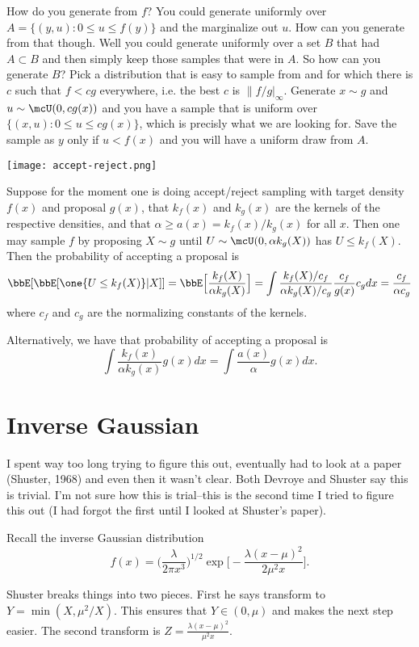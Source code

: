 \documentclass{article}
\begin{document}
How do you generate from $f$?  You could generate uniformly over $A = \{ (y,u) :
0 \leq u \leq f(y) \}$ and the marginalize out $u$.  How can you generate from
that though.  Well you could generate uniformly over a set $B$ that had $A
\subset B$ and then simply keep those samples that were in $A$.  So how can you
generate $B$?  Pick a distribution that is easy to sample from and for which
there is $c$ such that $f < cg$ everywhere, i.e. the best $c$ is
$\|f/g|_\infty$.  Generate $x \sim g$ and $u \sim \mcU(0, cg(x))$ and you have a
sample that is uniform over $\{(x,u) : 0 \leq u \leq cg(x) \}$, which is
precisly what we are looking for.  Save the sample as $y$ only if $u < f(x)$ and
you will have a uniform draw from $A$.

\texttt{[image: accept-reject.png]}

Suppose for the moment one is doing accept/reject sampling with target density
$f(x)$ and proposal $g(x)$, that $k_f(x)$ and $k_g(x)$ are the kernels of the
respective densities, and that $\alpha \geq a(x) = k_f(x) / k_g(x)$ for all $x$.
Then one may sample $f$ by proposing $X \sim g$ until $U \sim \mcU(0, \alpha
k_g(X))$ has $U \leq k_f(X)$.  Then the probability of accepting a proposal is
\[
\bbE[ \bbE[\one \{U \leq k_f(X)\} | X] ] = \bbE \Big[ \frac{k_f(X)}{\alpha
  k_g(X)} \Big] = \int \frac{k_f(X) / c_f}{\alpha k_g(X)/c_g}
\frac{c_f}{g(x)}{c_g} dx = \frac{c_f}{\alpha c_g}
\]
where $c_f$ and $c_g$ are the normalizing constants of the kernels.

Alternatively, we have that probability of accepting a proposal is
\[
\int \frac{k_f(x)}{\alpha k_g(x)} g(x) dx = \int \frac{a(x)}{\alpha} g(x) dx.
\]

\section{Inverse Gaussian}

I spent way too long trying to figure this out, eventually had to look at a
paper (Shuster, 1968) and even then it wasn't clear.  Both Devroye and Shuster
say this is trivial.  I'm not sure how this is trial--this is the second time I
tried to figure this out (I had forgot the first until I looked at Shuster's
paper).

Recall the inverse Gaussian distribution
\[
f(x) = \Big( \frac{\lambda}{2 \pi x^3} \Big)^{1/2} 
\exp \Big[ - \frac{\lambda(x-\mu)^2}{2 \mu^2 x} \Big].
\]

Shuster breaks things into two pieces. First he says transform to $Y = \min(X,
\mu^2 / X)$.  This ensures that $Y \in (0, \mu)$ and makes the next step
easier.  The second transform is $Z = \frac{\lambda (x-\mu)^2}{\mu^2 x}$.
\end{document}

